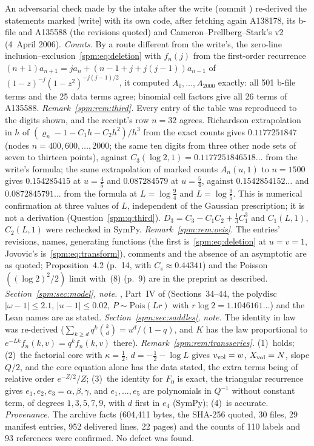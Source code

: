 \begin{writenote}
An adversarial check made by the intake after the write (commit
) re-derived the statements marked [write] with its own
code, after fetching again A138178, its b-file and A135588 (the revisions
quoted) and Cameron--Prellberg--Stark's v2 (4~April 2006).
\emph{Counts.} By a route different from the write's, the zero-line
inclusion--exclusion~\eqref{spm:eq:deletion} with $f_n(j)$ from the
first-order recurrence
$(n+1)a_{n+1}=ja_n+(n-1+j+j(j-1))a_{n-1}$ of
$(1-z)^{-j}(1-z^2)^{-j(j-1)/2}$, it computed $A_0,\ldots,A_{2000}$ exactly:
all 501 b-file terms and the 25 data terms agree; binomial cell factors
give all 26 terms of A135588. \emph{Remark~\ref{spm:rem:third}.} Every entry
of the table was reproduced to the digits shown, and the receipt's row
$n=32$ agrees. Richardson extrapolation in $h$ of
$(\varrho_n-1-C_1h-C_2h^2)/h^3$ from the exact counts gives
$0.1177251847$ (nodes $n=400,600,\ldots,2000$; the same ten digits from
three other node sets of seven to thirteen points), against $C_3(\log2,1)=0.1177251846518\ldots$ from the
write's formula; the same extrapolation of marked counts $A_n(u,1)$ to
$n=1500$ gives $0.154285415$ at $u=\tfrac45$ and $0.087284579$ at
$u=\tfrac54$, against $0.1542854152\ldots$ and $0.0872845791\ldots$ from the
formula at $L=\log\tfrac94$ and $L=\log\tfrac95$. This is numerical
confirmation at three values of $L$, independent of the Gaussian
prescription; it is not a derivation (Question~\ref{spm:q:third}).
$D_3=C_3-C_1C_2+\tfrac13C_1^3$ and $C_1(L,1)$, $C_2(L,1)$ were rechecked in
SymPy. \emph{Remark~\ref{spm:rem:oeis}.} The entries' revisions, names,
generating functions (the first is~\eqref{spm:eq:deletion} at $u=v=1$,
Jovovic's is~\eqref{spm:eq:transform}), comments and the absence of an
asymptotic are as quoted; Proposition~4.2 (p.~14, with $C_s\approx0.44341$)
and the Poisson$((\log2)^2/2)$ limit with~(8) (p.~9) are in the preprint as
described. \emph{Section~\ref{spm:sec:model}, note.} ,
Part~IV of  (Sections~34--44, the polydisc
$|\omega-1|\le2.1$, $|u-1|\le0.02$, $P\sim\mathrm{Pois}(Lr)$ with
$r\log2=1.1046161\ldots$) and the Lean names are as stated.
\emph{Section~\ref{spm:sec:saddles}, note.} The identity in law was
re-derived ($\sum_{k\ge d}q^k\binom kd=u^d/(1-q)$, and $K$ has the law
proportional to $e^{-Lk}f_n(k,v)=q^kf_n(k,v)$ there).
\emph{Remark~\ref{spm:rem:transseries}.} (1)~holds; (2)~the factorial core
with $\kappa=\tfrac12$, $d=-\tfrac12-\log L$ gives $v_{\rm vol}=w$,
$X_{\rm vol}=N$, slope $Q/2$, and the core equation alone has the
 data stated, the extra terms being of relative
order $e^{-Z/2}/Z$; (3)~the identity for $F_0$ is exact, the triangular
recurrence gives $e_1,e_2,e_3=\alpha,\beta,\gamma$, and
$e_1,\dots,e_5$ are polynomials in $Q^{-1}$ without constant term, of
degrees $1,3,5,7,9$, with $d$ first in $e_4$ (SymPy); (4)~is accurate.
\emph{Provenance.} The archive facts (604{,}411 bytes, the SHA-256 quoted,
30 files, 29 manifest entries, 952 delivered lines, 22 pages) and the counts
of 110 labels and 93 references were confirmed. No defect was found.
\end{writenote}
